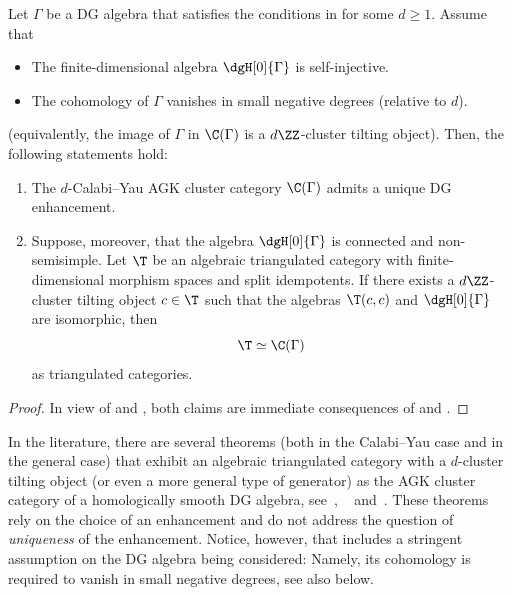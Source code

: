 \documentclass[a4paper]{amsart}
\begin{document}
\begin{theorem}
  \label{thm:AGK_uniqueness}
  Let $\Gamma$ be a DG algebra that satisfies the conditions in
   for some $d\geq1$. Assume that
  \begin{itemize}
  \item The finite-dimensional algebra $\dgH[0]{\Gamma}$ is self-injective.
  \item The cohomology of $\Gamma$ vanishes in small negative degrees (relative
    to $d$).
  \end{itemize}
  (equivalently, the image of $\Gamma$ in $\C(\Gamma)$ is a $d\ZZ$-cluster
  tilting object). Then, the following statements hold:
  \begin{enumerate}
  \item The $d$-Calabi--Yau AGK cluster category $\C(\Gamma)$ admits a unique DG
    enhancement.
  \item\label{it:CGamma_recognition}
    Suppose, moreover, that the algebra $\dgH[0]{\Gamma}$ is connected and
    non-semisimple. Let $\T$ be an algebraic
    triangulated category with finite-dimensional morphism spaces and split
    idempotents. If there exists a $d\ZZ$-cluster tilting object $c\in\T$ such
    that the algebras $\T(c,c)$ and $\dgH[0]{\Gamma}$ are isomorphic, then
    \[
      \T\simeq\C(\Gamma)
    \]
    as triangulated categories.
  \end{enumerate}  
\end{theorem}
\begin{proof}
  In view of  and , both
  claims are immediate consequences of 
  and .
\end{proof}

\begin{remark}
  \label{rmk:other_CGamma_thms}
  In the literature, there are several theorems (both in the Calabi--Yau case
  and in the general case) that exhibit an algebraic triangulated category with
  a $d$-cluster tilting object (or even a more general type of generator) as the
  AGK cluster category of a homologically smooth DG algebra, see~\cite{Tab07a},
  ~\cite[Thm.4.1]{KY20} and~\cite[Thm.~3.3]{Han22}. These theorems rely on the
  choice of an enhancement and do not address the question of \emph{uniqueness}
  of the enhancement. Notice, however, that  includes a
  stringent assumption on the DG algebra being considered: Namely, its
  cohomology is required to vanish in small negative degrees, see also
   below.
\end{remark}
\end{document}
